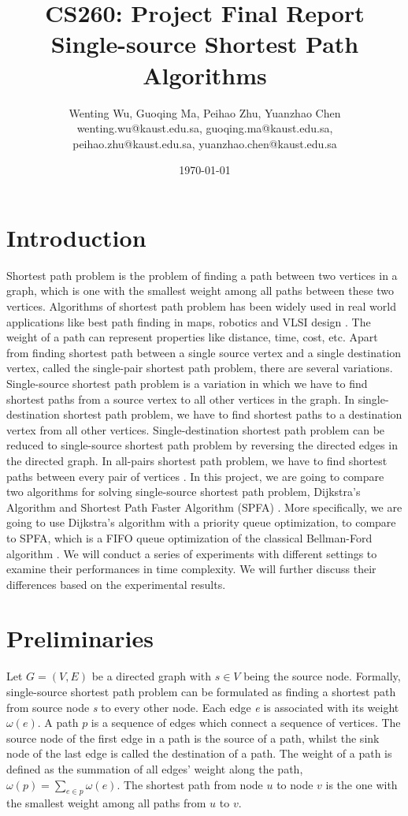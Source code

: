 \documentclass[a4paper, margin=15in]{article}
\title{CS260: Project Final Report \\ Single-source Shortest Path Algorithms
}
\author{Wenting Wu, Guoqing Ma, Peihao Zhu, Yuanzhao Chen \\ wenting.wu@kaust.edu.sa, guoqing.ma@kaust.edu.sa, \\ peihao.zhu@kaust.edu.sa, yuanzhao.chen@kaust.edu.sa}
\date{\today}
\begin{document}
\maketitle

\section{Introduction}
Shortest path problem is the problem of finding a path between two vertices in a graph, which is one with the smallest weight among all paths between these two vertices. Algorithms of shortest path problem has been widely used in real world applications like best path finding in maps, robotics and VLSI design \cite{Wikipedia}. The weight of a path can represent properties like distance, time, cost, etc. Apart from finding shortest path between a single source vertex and a single destination vertex, called the single-pair shortest path problem, there are several variations. Single-source shortest path problem is a variation in which we have to find shortest paths from a source vertex to all other vertices in the graph. In single-destination shortest path problem, we have to find shortest paths to a destination vertex from all other vertices. Single-destination shortest path problem can be reduced to single-source shortest path problem by reversing the directed edges in the directed graph. In all-pairs shortest path problem, we have to find shortest paths between every pair of vertices \cite{Wikipedia}. In this project, we are going to compare two algorithms for solving single-source shortest path problem, Dijkstra's Algorithm \cite{cormen2009introduction} and Shortest Path Faster Algorithm (SPFA) \cite{WikiSPFA}. More specifically, we are going to use Dijkstra's algorithm with a priority queue optimization, to compare to SPFA, which is a FIFO queue optimization of the classical Bellman-Ford algorithm \cite{bellman1958routing}. We will conduct a series of experiments with different settings to examine their performances in time complexity. We will further discuss their differences based on the experimental results.

\section{Preliminaries}
Let $G = (V, E)$ be a directed graph with $ s \in V$ being the source node. Formally, single-source shortest path problem can be formulated as finding a shortest path from source node \emph{s} to every other node. Each edge \emph{e} is associated with its weight $\omega(e)$. A path $p$ is a sequence of edges which connect a sequence of vertices. The source node of the first edge in a path is the source of a path, whilst the sink node of the last edge is called the destination of a path. The weight of a path is defined as the summation of all edges' weight along the path, $\omega(p) =
\sum_{e \in p}\omega(e)$. The shortest path from node $u$ to node $v$ is the one with the smallest weight among all paths from $u$ to $v$.
\end{document}

